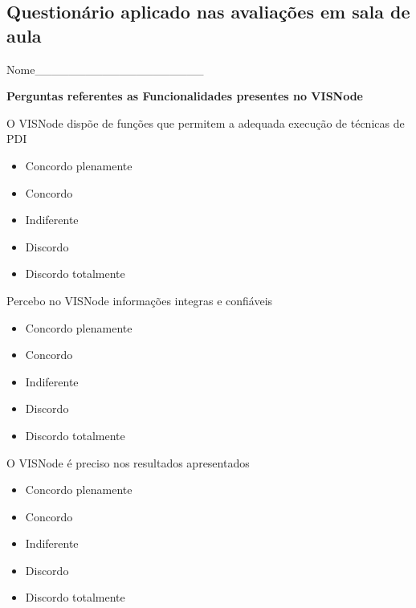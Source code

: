 \documentclass[
	12pt,				%
	oneside,			%
	a4paper,			%
	english,			%
	french,				%
	spanish,			%
	brazil,				%
	]{abntex2}
\makeatletter
\newcommand*{\radiobutton}{%
  \@ifstar{\@radiobutton0}{\@radiobutton1}%
}
\newcommand*{\@radiobutton}[1]{%
  \begin{tikzpicture}
    \pgfmathsetlengthmacro\radius{height("X")/2}
    \draw[radius=\radius] circle;
    \ifcase#1 \fill[radius=.6*\radius] circle;\fi
  \end{tikzpicture}%
}
\makeatother
\begin{document}
\begin{apendicesenv}

\partapendices

\chapter{Questionário aplicado nas avaliações em sala de aula}
\label{apen:questionario}

\noindent Nome\_\_\_\_\_\_\_\_\_\_\_\_\_\_\_\_\_\_\_\_

\vspace{3mm}

\noindent\textbf{Perguntas referentes as Funcionalidades presentes no VISNode}

\vspace{3mm}

\noindent O VISNode dispõe de funções que permitem a adequada execução de técnicas de PDI

\begin{itemize}
\item[\radiobutton] Concordo plenamente
\item[\radiobutton] Concordo
\item[\radiobutton] Indiferente
\item[\radiobutton] Discordo
\item[\radiobutton] Discordo totalmente
\end{itemize}

\noindent Percebo no VISNode informações integras e confiáveis

\begin{itemize}
\item[\radiobutton] Concordo plenamente
\item[\radiobutton] Concordo
\item[\radiobutton] Indiferente
\item[\radiobutton] Discordo
\item[\radiobutton] Discordo totalmente
\end{itemize}

\noindent O VISNode é preciso nos resultados apresentados

\begin{itemize}
\item[\radiobutton] Concordo plenamente
\item[\radiobutton] Concordo
\item[\radiobutton] Indiferente
\item[\radiobutton] Discordo
\item[\radiobutton] Discordo totalmente
\end{itemize}


\end{apendicesenv}
\end{document}
